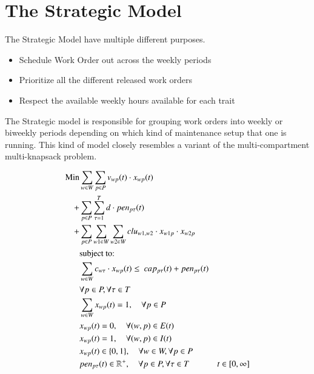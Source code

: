 \section{The Strategic Model}


The Strategic Model have multiple different purposes.
\begin{itemize}
	\item Schedule Work Order out across the weekly periods
	\item Prioritize all the different released work orders
	\item Respect the available weekly hours available for each trait
\end{itemize}

The Strategic model is responsible for grouping work orders into weekly or biweekly periods depending on which kind of maintenance setup that one is running.
This kind of model closely resembles a variant of the multi-compartment multi-knapsack problem. 

\begin{alignat}{2}
	\text{Min} &\sum_{w \in W} \sum_{p \in P} v_{wp}(t) \cdot x_{wp}(t)                                                                                             \\ 
	+ & \sum_{p \in P} \sum_{\tau = 1}^T d \cdot pen_{p\tau}(t)                                                                                                     \\
	+ & \sum_{p \in P} \sum_{w1 \in W} \sum_{w2 \in W} clu_{w1, w2} \cdot x_{w1p} \cdot x_{w2p}                              \label{eqn:objective_function_strategic} \\
    & \text{subject to:} \notag                                                                                                                                       \\
	& \sum_{w \in W} c_{w\tau} \cdot x_{wp}(t) \leq \ cap_{p\tau}(t) + pen_{p\tau}(t) \notag                                                                          \\ 
	& \forall p \in P, \forall \tau \in T                                                                                    \label{eqn:capacity_constraint}          \\
	& \sum_{w \in W} x_{wp}(t) = 1                                              , \quad \forall p \in P                      \label{eqn:single_workorder_constraint}  \\
	& x_{wp}(t) = 0                                                             , \quad \forall (w, p) \in E(t)              \label{eqn:exclusion_constraint}         \\
	& x_{wp}(t) = 1                                                             , \quad \forall (w, p) \in I(t)              \label{eqn:inclusion_constraint}         \\
	& x_{wp}(t) \in \{0, 1\}                                                    , \quad \forall w \in W, \forall p \in P     \label{eqn:x_integrality_constraint}     \\ 
	& pen_{p\tau}(t) \in \mathbb{R}^{+}                                         , \quad \forall p \in P, \forall \tau \in T  \label{eqn:p_non_negativity_constraint}
    & t \in  [0, \infty] 
\end{alignat}
